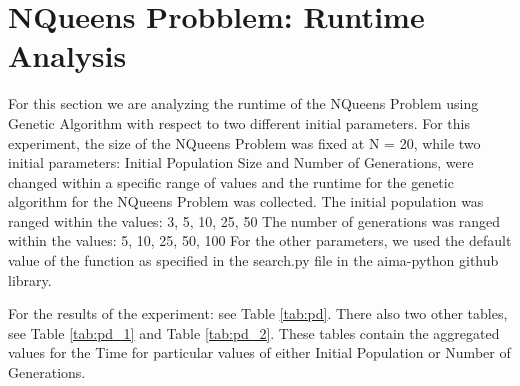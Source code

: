 \documentclass[11pt]{article}
\begin{document}
\section{NQueens Probblem: Runtime Analysis}

For this section we are analyzing the runtime of the NQueens Problem using Genetic Algorithm with respect to two different initial parameters.
For this experiment, the size of the NQueens Problem was fixed at N = 20, while two initial parameters: Initial Population Size and Number of Generations, 
were changed within a specific range of values and the runtime for the genetic algorithm for the NQueens Problem was collected.
The initial population was ranged within the values: 3, 5, 10, 25, 50
The number of generations was ranged within the values: 5, 10, 25, 50, 100
For the other parameters, we used the default value of the function as specified in the search.py file in the aima-python github library.


For the results of the experiment: see Table \ref{tab:pd}. There also two other tables, see Table \ref{tab:pd_1} and Table \ref{tab:pd_2}.
These tables contain the aggregated values for the Time for particular values of either Initial Population or Number of Generations.
\end{document}
